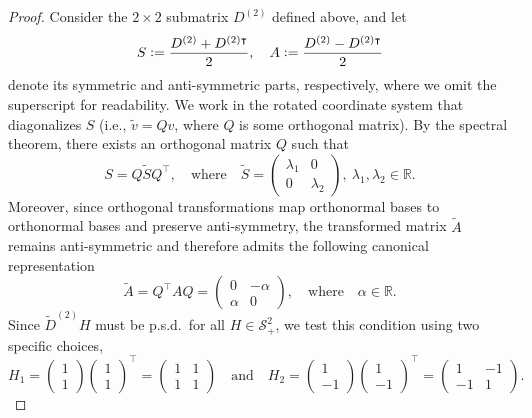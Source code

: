 \documentclass[twoside,11pt]{article}
\newcommand{\R}{\mathbb{R}}
\begin{document}
\begin{proof}
  Consider the $2 \times 2$ submatrix $D^{(2)}$ defined above, and let
  \[
    S \vcentcolon= \frac{D^{(2)} + D^{(2)\intercal}}{2},
    \quad
    A \vcentcolon= \frac{D^{(2)} - D^{(2)\intercal}}{2}
  \]
  denote its symmetric and anti-symmetric parts, respectively, where we omit the superscript for readability.
  We work in the rotated coordinate system that diagonalizes $S$ (i.e., $\tilde{v} = Qv$, where $Q$ is some orthogonal matrix). 
  By the spectral theorem, there exists an orthogonal matrix $Q$ such that
  \[
    S = Q \tilde{S} Q^\intercal,
    \quad\text{where}\quad
    \tilde{S} = \begin{pmatrix} \lambda_1 & 0 \\ 0 & \lambda_2 \end{pmatrix},\
    \lambda_1, \lambda_2 \in \R. 
  \]
  Moreover, since orthogonal transformations map orthonormal bases to orthonormal bases and preserve anti-symmetry, the transformed matrix $\tilde{A}$ remains anti-symmetric and therefore admits the following canonical representation 
  \[
    \tilde{A} = Q^\intercal A Q = \begin{pmatrix} 0 & -\alpha \\ \alpha & 0 \end{pmatrix},
    \quad\text{where}\quad
    \alpha \in \R.
  \]
  Since $\tilde{D}^{(2)}H$ must be p.s.d.\ for all $H \in \mathcal{S}^2_+$, we test this condition using two specific choices,
  \begin{equation*}
    H_1 = \begin{pmatrix} 1 \\ 1 \end{pmatrix} \begin{pmatrix} 1 \\ 1 \end{pmatrix}^\intercal = \begin{pmatrix} 1 & 1 \\ 1 & 1 \end{pmatrix}
    \quad\text{and}\quad
    H_2 = \begin{pmatrix} 1 \\ -1 \end{pmatrix} \begin{pmatrix} 1 \\ -1 \end{pmatrix}^\intercal = \begin{pmatrix} 1 & -1 \\ -1 & 1 \end{pmatrix}.
  \end{equation*}

\end{proof}
\end{document}
